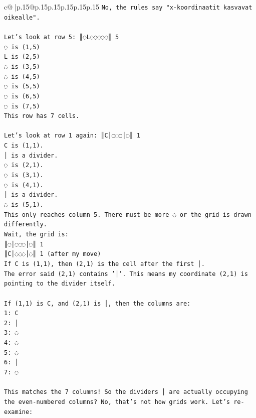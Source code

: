 \documentclass{article}
\begin{document}
{\begin{supertabular}{c@{$\;$}|p{.15\linewidth}@{}p{.15\linewidth}p{.15\linewidth}p{.15\linewidth}p{.15\linewidth}p{.15\linewidth}}
{{{\texttt{No, the rules say "x{-}koordinaatit kasvavat oikealle".} \\
\\ 
\texttt{Let's look at row 5: ║◌L◌◌◌◌◌║ 5} \\
\texttt{◌ is (1,5)} \\
\texttt{L is (2,5)} \\
\texttt{◌ is (3,5)} \\
\texttt{◌ is (4,5)} \\
\texttt{◌ is (5,5)} \\
\texttt{◌ is (6,5)} \\
\texttt{◌ is (7,5)} \\
\texttt{This row has 7 cells.} \\
\\ 
\texttt{Let's look at row 1 again: ║C│◌◌◌│◌║ 1} \\
\texttt{C is (1,1).} \\
\texttt{│ is a divider.} \\
\texttt{◌ is (2,1).} \\
\texttt{◌ is (3,1).} \\
\texttt{◌ is (4,1).} \\
\texttt{│ is a divider.} \\
\texttt{◌ is (5,1).} \\
\texttt{This only reaches column 5. There must be more ◌ or the grid is drawn differently.} \\
\texttt{Wait, the grid is:} \\
\texttt{║◌│◌◌◌│◌║ 1} \\
\texttt{║C│◌◌◌│◌║ 1 (after my move)} \\
\texttt{If C is (1,1), then (2,1) is the cell after the first │.} \\
\texttt{The error said (2,1) contains '│'. This means my coordinate (2,1) is pointing to the divider itself.} \\
\\ 
\texttt{If (1,1) is C, and (2,1) is │, then the columns are:} \\
\texttt{1: C} \\
\texttt{2: │} \\
\texttt{3: ◌} \\
\texttt{4: ◌} \\
\texttt{5: ◌} \\
\texttt{6: │} \\
\texttt{7: ◌} \\
\\ 
\texttt{This matches the 7 columns! So the dividers │ are actually occupying the even{-}numbered columns? No, that's not how grids work. Let's re{-}examine:} \\
}}}
\end{supertabular}}
\end{document}
